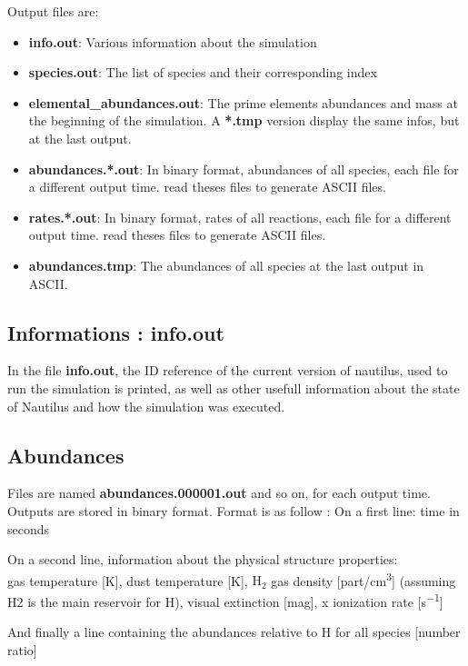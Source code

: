 \documentclass[english,a4paper,twoside]{article}
\newcommand{\molecule}[1]{\ensuremath{\mathrm{#1}}}
\begin{document}
Output files are:
\begin{itemize}
\item \textbf{info.out}: Various information about the simulation
\item \textbf{species.out}: The list of species and their corresponding index
\item \textbf{elemental\_abundances.out}: The prime elements abundances and mass at the beginning of the simulation. A \textbf{*.tmp} version display the same infos, but at the last output.
\item \textbf{abundances.*.out}: In binary format, abundances of all species, each file for a different output time.  read theses files to generate ASCII files.
\item \textbf{rates.*.out}: In binary format, rates of all reactions, each file for a different output time.  read theses files to generate ASCII files.
\item \textbf{abundances.tmp}: The abundances of all species at the last output in ASCII.
\end{itemize}

\subsection{Informations : info.out}
In the file \textbf{info.out}, the ID reference of the current version of nautilus, used to run the simulation is printed, as well as other usefull information about the state of Nautilus and how the simulation was executed.

\subsection{Abundances}
Files are named \textbf{abundances.000001.out} and so on, for each output time. Outputs are stored in binary format. Format is as follow : 
On a first line: time in seconds

On a second line, information about the physical structure properties: \\
gas temperature [\unit{K}], dust temperature [\unit{K}], \molecule{H_2} gas density [\unit{part/cm^3}] (assuming H2 is the main reservoir for H), visual extinction [\unit{mag}], x ionization rate [\unit{s^{-1}}]

And finally a line containing the abundances relative to H for all species [number ratio]
\end{document}
